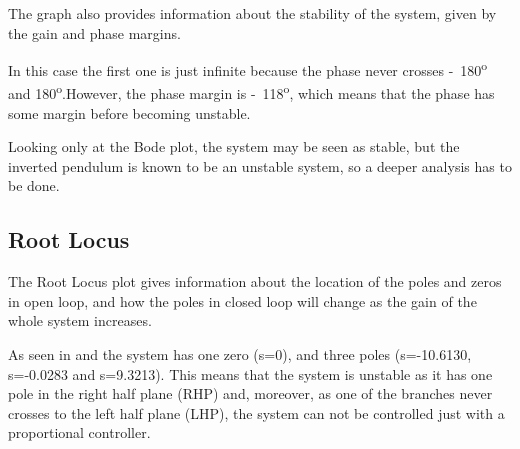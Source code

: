 The graph also provides information about the stability of the system, given by the gain and phase margins. 

In this case the first one is just infinite because the phase never crosses \si{-180^o} and \si{180^o}.However, the phase margin is \si{-118^o}, which means that the phase has some margin before becoming unstable.

Looking only at the Bode plot, the system may be seen as stable, but the inverted pendulum is known to be an unstable system, so a deeper analysis has to be done.

\subsection{Root Locus}
The Root Locus plot gives information about the location of the poles and zeros in open loop, and how the poles in closed loop will change as the gain of the whole system increases.

As seen in  and  the system has one zero (s=0), and three poles (s=-10.6130, s=-0.0283 and s=9.3213). This means that the system is unstable as it has one pole in the right half plane (RHP) and, moreover, as one of the branches never crosses to the left half plane (LHP), the system can not be controlled just with a proportional controller.


